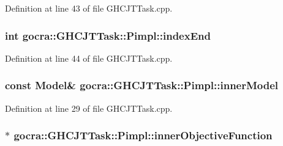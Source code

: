Definition at line 43 of file G\+H\+C\+J\+T\+Task.\+cpp.

\subsubsection[{\texorpdfstring{index\+End}{indexEnd}}]{\setlength{\rightskip}{0pt plus 5cm}int gocra\+::\+G\+H\+C\+J\+T\+Task\+::\+Pimpl\+::index\+End}\hypertarget{structgocra_1_1GHCJTTask_1_1Pimpl_ada601a59aeedcd018df465a5e2e79e03}{}\label{structgocra_1_1GHCJTTask_1_1Pimpl_ada601a59aeedcd018df465a5e2e79e03}


Definition at line 44 of file G\+H\+C\+J\+T\+Task.\+cpp.

\subsubsection[{\texorpdfstring{inner\+Model}{innerModel}}]{\setlength{\rightskip}{0pt plus 5cm}const {\bf Model}\& gocra\+::\+G\+H\+C\+J\+T\+Task\+::\+Pimpl\+::inner\+Model}\hypertarget{structgocra_1_1GHCJTTask_1_1Pimpl_a7f03506d78950aa1a986d2ba44142f28}{}\label{structgocra_1_1GHCJTTask_1_1Pimpl_a7f03506d78950aa1a986d2ba44142f28}


Definition at line 29 of file G\+H\+C\+J\+T\+Task.\+cpp.

\subsubsection[{\texorpdfstring{inner\+Objective\+Function}{innerObjectiveFunction}}]{$\ast$ gocra\+::\+G\+H\+C\+J\+T\+Task\+::\+Pimpl\+::inner\+Objective\+Function}\hypertarget{structgocra_1_1GHCJTTask_1_1Pimpl_a1faaaea4991fa4a0bec914732c189fd3}{}\label{structgocra_1_1GHCJTTask_1_1Pimpl_a1faaaea4991fa4a0bec914732c189fd3}


